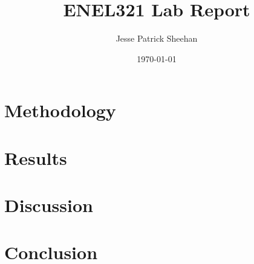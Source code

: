 \documentclass[12pt]{article} %
\title{ENEL321 Lab Report}
\date{\today}
\author{Jesse Patrick Sheehan}
\begin{document}
\maketitle

\vfill

\renewcommand{\abstractname}{Executive Summary}

\begin{abstract}




\end{abstract}

\newpage

\section{Methodology}


\newpage

\section{Results}


\newpage

\section{Discussion}


\newpage

\section{Conclusion}

\end{document}
